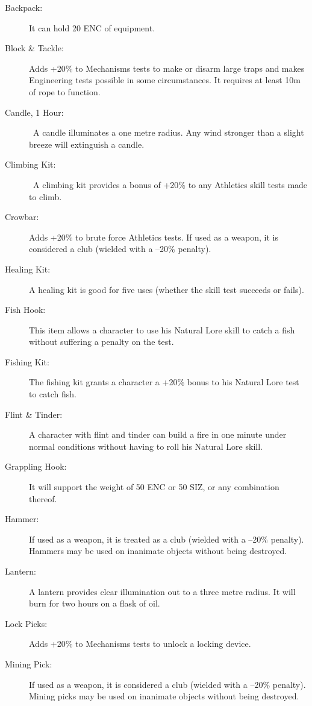 

\begin{description}
	\item[Backpack:] It can hold 20 ENC of equipment. 
	\item[Block \& Tackle:] Adds +20\% to Mechanisms tests to make or disarm large traps and makes Engineering tests possible in some circumstances. It requires at least 10m of rope to function. 
	\item[Candle, 1 Hour:]  A candle illuminates a one metre radius. Any wind stronger than a slight breeze will extinguish a candle. 
	\item[Climbing Kit:]  A climbing kit provides a bonus of +20\% to any Athletics skill tests made to climb. 
	\item[Crowbar:] Adds +20\% to brute force Athletics tests. If used as a weapon, it is considered a club (wielded with a –20\% penalty). 
	\item[Healing Kit:] A healing kit is good for five uses (whether the skill test succeeds or fails). 
	\item[Fish Hook:] This item allows a character to use his Natural Lore skill to catch a fish without suffering a penalty on the test. 
	\item[Fishing Kit:] The fishing kit grants a character a +20\% bonus to his Natural Lore test to catch fish. 
	\item[Flint \& Tinder:] A character with flint and tinder can build a fire in one minute under normal conditions without having to roll his Natural Lore skill. 
	\item[Grappling Hook:] It will support the weight of 50 ENC or 50 SIZ, or any combination thereof. 
	\item[Hammer:] If used as a weapon, it is treated as a club (wielded with a –20\% penalty). Hammers may be used on inanimate objects without being destroyed. 
	\item[Lantern:] A lantern provides clear illumination out to a three metre radius. It will burn for two hours on a flask of oil. 
	\item[Lock Picks:] Adds +20\% to Mechanisms tests to unlock a locking device. 
	\item[Mining Pick:] If used as a weapon, it is considered a club (wielded with a –20\% penalty). Mining picks may be used on inanimate objects without being destroyed. 

\end{description}
